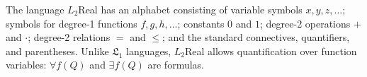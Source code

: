 The language $L_2$Real has an alphabet consisting of variable symbols $x, y, z, \ldots$; symbols for degree-1 functions $f, g, h, \ldots$; constants $0$ and $1$; degree-2 operations $+$ and $\cdot$; degree-2 relations $=$ and $\leqslant$; and the standard connectives, quantifiers, and parentheses. Unlike $\mathfrak{L}_1$ languages, $L_2$Real allows quantification over function variables: $\forall f(Q)$ and $\exists f(Q)$ are formulas.
